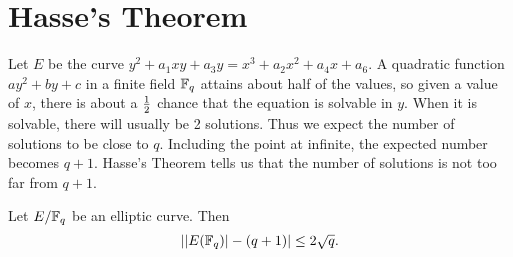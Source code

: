 %
\section{Hasse's Theorem}
Let $E$ be the curve $y^2+a_1xy+a_3y=x^3+a_2x^2+a_4x+a_6$. A quadratic function $ay^2+by+c$ in a finite field $\mathbb{F}_q$ attains about half of the values, so given a value of $x$, there is about a $\frac{1}{2}$ chance that the equation is solvable in $y$. When it is solvable, there will usually be 2 solutions. Thus we expect the number of solutions to be close to $q$. Including the point at infinite, the expected number becomes $q+1$. Hasse's Theorem tells us that the number of solutions is not too far from $q+1$.
\begin{thm}
Let $E/\mathbb{F}_q$ be an elliptic curve. Then
\[
||E(\mathbb{F}_q)|-(q+1)|\le 2\sqrt q.
\]
\end{thm}
